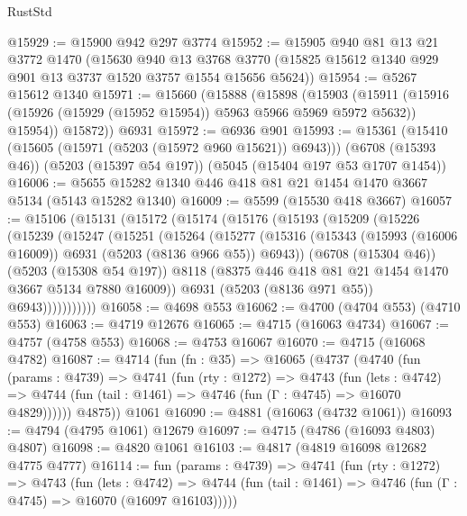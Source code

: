 \begin{lexlean}{RustStd}
\begin{coremodule}
@15929 := @15900 @942 @297 @3774
@15952 := @15905
    @940
    @81
    @13
    @21
    @3772
    @1470
    (@15630
      @940
      @13
      @3768
      @3770
      (@15825 @15612 @1340 @929 @901 @13 @3737 @1520 @3757 @1554 @15656 @5624))
@15954 := @5267 @15612 @1340
@15971 := @15660
    (@15888
      (@15898
        (@15903
          (@15911 (@15916 (@15926 (@15929 (@15952 @15954)) @5963 @5966 @5969 @5972 @5632)) @15954))
        @15872))
    @6931
@15972 := @6936 @901
@15993 := @15361
    (@15410 (@15605 (@15971 (@5203 (@15972 @960 @15621)) @6943)))
    (@6708 (@15393 @46))
    (@5203 (@15397 @54 @197))
    (@5045 (@15404 @197 @53 @1707 @1454))
@16006 := @5655 @15282 @1340 @446 @418 @81 @21 @1454 @1470 @3667 @5134 (@5143 @15282 @1340)
@16009 := @5599 (@15530 @418 @3667)
@16057 := @15106
    (@15131
      (@15172
        (@15174
          (@15176
            (@15193
              (@15209
                (@15226
                  (@15239
                    (@15247
                      (@15251
                        (@15264
                          (@15277
                            (@15316
                              (@15343
                                (@15993 (@16006 @16009))
                                @6931
                                (@5203 (@8136 @966 @55))
                                @6943))
                            (@6708 (@15304 @46))
                            (@5203 (@15308 @54 @197))
                            @8118
                            (@8375 @446 @418 @81 @21 @1454 @1470 @3667 @5134 @7880 @16009))
                          @6931
                          (@5203 (@8136 @971 @55))
                          @6943)))))))))))
@16058 := @4698 @553
@16062 := @4700 (@4704 @553) (@4710 @553)
@16063 := @4719 @12676
@16065 := @4715 (@16063 @4734)
@16067 := @4757 (@4758 @553)
@16068 := @4753 @16067
@16070 := @4715 (@16068 @4782)
@16087 := @4714
    (fun (fn : @35) =>
    @16065
      (@4737
        (@4740
          (fun (params : @4739) =>
          @4741
            (fun (rty : @1272) =>
            @4743
              (fun (lets : @4742) =>
              @4744 (fun (tail : @1461) => @4746 (fun (Γ : @4745) => @16070 @4829))))))
        @4875))
    @1061
@16090 := @4881 (@16063 (@4732 @1061))
@16093 := @4794 (@4795 @1061) @12679
@16097 := @4715 (@4786 (@16093 @4803) @4807)
@16098 := @4820 @1061
@16103 := @4817 (@4819 @16098 @12682 @4775 @4777)
@16114 := fun (params : @4739) =>
  @4741
    (fun (rty : @1272) =>
    @4743
      (fun (lets : @4742) =>
      @4744 (fun (tail : @1461) => @4746 (fun (Γ : @4745) => @16070 (@16097 @16103)))))

\end{coremodule}
\end{lexlean}
